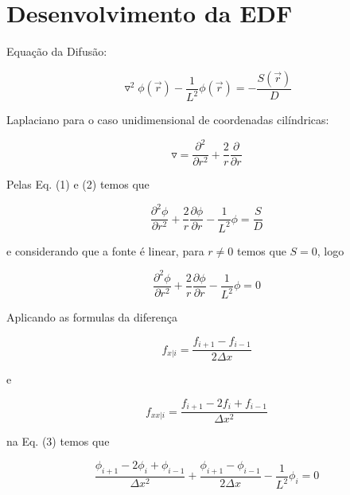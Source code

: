 \documentclass{article}
\begin{document}
    \section{Desenvolvimento da EDF}
        Equação da Difusão:
        
        \begin{equation}
            \triangledown^2 \phi (\vec r) - \frac{1}{L^2} \phi(\vec r) = - \frac{S(\vec r)}{D}
        \end{equation}
        
        Laplaciano para o caso unidimensional de coordenadas cilíndricas:
        
        \begin{equation}
            \triangledown =  \frac{\partial^2}{\partial r^2}  + \frac{2}{r} \frac{\partial}{\partial r}
        \end{equation}
        
        Pelas Eq. (1) e (2) temos que
        
        \begin{equation}
            \frac{\partial^2\phi}{\partial r^2}  + \frac{2}{r} \frac{\partial\phi}{\partial r} - \frac{1}{L^2} \phi = \frac{S}{D}
        \end{equation}

        e considerando que a fonte é linear, para $r \neq 0$ temos que $S = 0$, logo

        \begin{equation}
            \frac{\partial^2\phi}{\partial r^2}  + \frac{2}{r} \frac{\partial\phi}{\partial r} - \frac{1}{L^2} \phi = 0
        \end{equation}
        
        Aplicando as formulas da diferença
        
        \begin{equation}
            f_{x|i} = \frac{f_{i+1} - f_{i-1}}{2 \Delta x} 
        \end{equation}
        
        e
        
        \begin{equation}
            f_{xx|i} = \frac{f_{i+1} - 2 f_i + f_{i-1}}{\Delta x^2} 
        \end{equation}
        
        na Eq. (3) temos que
        
        \begin{equation}
            \frac{\phi_{i+1} - 2 \phi_i + \phi_{i-1}}{\Delta x^2} + \frac{\phi_{i+1} - \phi_{i-1}}{2 \Delta x} - \frac{1}{L^2} \phi_i = 0
        \end{equation}
        
\end{document}
